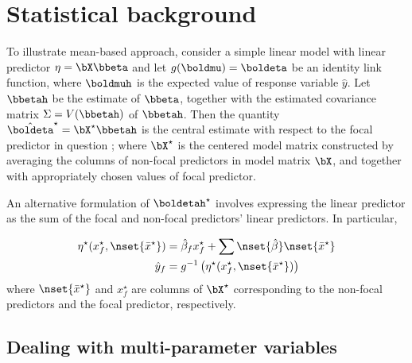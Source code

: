 \section{Statistical background}

To illustrate mean-based approach, consider a simple linear model with linear predictor $\eta = \bX\bbeta$ and let $g(\boldmu) = \boldeta$ be an identity link function, where $\boldmuh$ is the expected value of response variable $\hat{y}$. Let $\bbetah$ be the estimate of $\bbeta$, together with the estimated covariance matrix $\Sigma = V(\bbetah)$ of $\bbetah$. Then the quantity $\hat{\boldeta}^\star = \bX^\star\bbetah$ is the central estimate with respect to the focal predictor in question \citep{fox2009effect}; where $\bX^\star$ is the centered model matrix constructed by averaging the columns of non-focal predictors in model matrix $\bX$, and together with appropriately chosen values of focal predictor.

An alternative formulation of $\boldetah^\star$ involves expressing the linear predictor as the sum of the focal and non-focal predictors' linear predictors. In particular, 

\begin{align}\label{eq:eta_mean}
\eta^\star(x^\star_f, \nset{{\bar{x}^\star}}) &= \hat{\beta}_f x^\star_f + \sum \nset{\hat{\beta}} \nset{{\bar{x}^\star}} \\
\hat{y}_f  &= g^{-1} \left(\eta^\star(x^\star_f, \nset{{\bar{x}^\star}})\right)
\end{align}
where $\nset{{\bar{x}^\star}}$ and $x^\star_f$ are columns of $\bX^\star$ corresponding to the non-focal predictors and the focal predictor, respectively.


\subsection{Dealing with multi-parameter variables}

